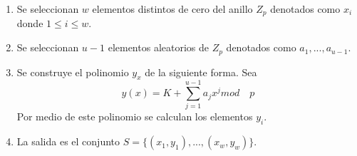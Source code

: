 \documentclass[12pt,oneside,onecolumn,openany]{report}
\begin{document}
\begin{enumerate}
 \item Se seleccionan $w$ elementos distintos de cero del anillo $Z_p$ denotados como $x_i$ donde $1 \leq i \leq w$.
 \item Se seleccionan $u-1$ elementos aleatorios de $Z_p$ denotados como $a_1,...,a_{u-1}$.
 \item Se construye el polinomio $y_x$ de la siguiente forma. Sea \begin{equation}
            y(x)=K+\sum_{j=1}^{u-1} a_j x^j mod \quad p
           \end{equation}
           Por medio de este polinomio se calculan los elementos $y_i$.
 \item La salida es el conjunto $S=\{(x_1,y_1),...,(x_w,y_w)\}$.
\end{enumerate}
\end{document}
